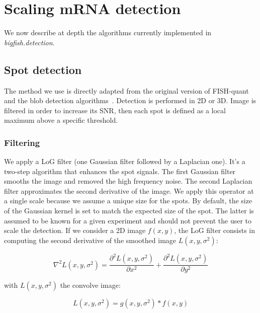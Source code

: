 \section{Scaling \ac{mRNA} detection}
\label{sec:method}

We now describe at depth the algorithms currently implemented in \emph{bigfish.detection}.

\subsection{Spot detection}
\label{subsec:spot_detection}

The method we use is directly adapted from the original version of FISH-quant~\cite{mueller_fish-quant_2013} and the blob detection algorithms~\cite{walt_scikit-image_2014}.
Detection is performed in 2D or 3D. Image is filtered in order to increase its \ac{SNR}, then each spot is defined as a local maximum above a specific threshold.

\subsubsection{Filtering}

We apply a \ac{LoG} filter (one Gaussian filter followed by a Laplacian one).
It's a two-step algorithm that enhances the spot signals.
The first Gaussian filter smooths the image and removed the high frequency noise.
The second Laplacian filter approximates the second derivative of the image.
We apply this operator at a single scale because we assume a unique size for the spots.
By default, the size of the Gaussian kernel is set to match the expected size of the spot.
The latter is assumed to be known for a given experiment and should not prevent the user to scale the detection.
If we consider a 2D image $f(x,y)$, the \ac{LoG} filter consists in computing the second derivative of the smoothed image $L(x, y, \sigma^2)$:

\begin{equation}
	{\displaystyle \nabla^{2}L(x, y, \sigma^2) = \frac{\partial^{2}L(x, y, \sigma^2)}{\partial x^2} + \frac{\partial^{2}L(x, y, \sigma^2)}{\partial y^2}}
\end{equation}

\noindent
with $L(x, y, \sigma^2)$ the convolve image:

\begin{equation}
	{\displaystyle L(x, y, \sigma^2) = g(x, y, \sigma^2) * f(x, y)}
\end{equation}

